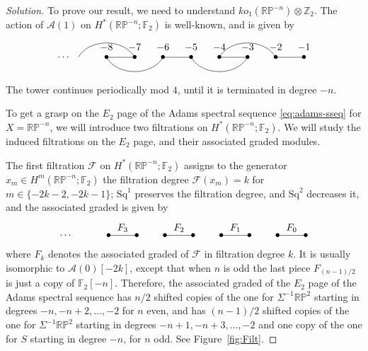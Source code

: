 \documentclass{amsart}
\def\RP{\mathbb{RP}}
\def\Filt{\mathcal{F}}
\newcommand{\Steenrod}{\mathcal{A}}
\newcommand{\Aone}{\Steenrod(1)}
\newcommand{\Azero}{\Steenrod(0)}
\newcommand{\FF}{\mathbb{F}}
\newcommand{\ZZ}{\mathbb{Z}}
\newcommand{\Sq}{\mathrm{Sq}}
\begin{document}
\begin{proof}[Solution]
To prove our result, we need to understand
$ko_1(\RP^{-n}) \otimes \ZZ_2$. The action of $\Aone$ on
$H^*(\RP^{-n} ; \FF_2)$ is well-known, and is given by
\begin{equation}
\vcenter{\hbox{\begin{tikzpicture}[xscale=-1]
    \foreach\i in {1,...,8}{
      \node at (\i,0) {$\bullet$};
      \node[anchor=south] at (\i,0.1) {$-\i$};
    }
    \foreach \i in {1,3,...,7}{
      \draw (\i,0) -- (\i+1,0);
    }
    \foreach \i/\r in {2/1,3/-1,6/-1,7/1}{
      \draw (\i,0) to[out=\r*60,in=\r*120] (\i+2,0);
    }
    \node at (9.5,0) {$\cdots$};
  \end{tikzpicture}}}
\end{equation}
The tower continues periodically mod $4$, until it is terminated in degree $-n$.


To get a grasp on the $E_2$ page of the Adams spectral sequence \eqref{eq:adams-sseq} for $X=\RP^{-n}$, we will introduce two filtrations on $H^*(\RP^{-n}; \FF_2)$. We will study the induced filtrations on the $E_2$ page, and their associated graded modules.



The first filtration $\Filt$ on $H^*(\RP^{-n}; \FF_2)$ assigns to the generator $x_m \in H^m(\RP^{-n}; \FF_2)$ the filtration degree $\Filt(x_m) = k$ for  $m \in\{  -2k-2, -2k-1\}$; $\Sq^1$ preserves the filtration degree, and $\Sq^2$ decreases it, and the associated graded is given by
\begin{equation}
\vcenter{\hbox{\begin{tikzpicture}[xscale=-1]
    \foreach\i in {1,...,8}{
      \node at (\i,0) {$\bullet$};
    }
    \foreach \i in {0,1,2,3}{
      \draw (2*\i+1,0) -- (2*\i+2,0);
      \node[anchor=south] at (2*\i+1.5,0) {$F_\i$};
    }
    \node at (9.5,0) {$\cdots$};
  \end{tikzpicture}}}
\end{equation}
where $F_k$ denotes the associated graded of $\Filt$ in filtration
degree $k$. It is usually isomorphic to $\Azero[-2k]$, except that when $n$
is odd the last piece $F_{(n-1)/2}$ is just a copy of $\FF_2[-n]$. Therefore, the associated graded
of the $E_2$ page of the Adams spectral sequence has $n/2$ shifted
copies of the one for $\Sigma^{-1}\RP^2$ starting in degrees
$-n, -n+2, \dots, -2$ for $n$ even, and has $(n-1)/2$ shifted copies
of the one for $\Sigma^{-1}\RP^2$ starting in degrees
$-n+1, -n+3, \dots, -2$ and one copy of the one for $S$ starting in
degree $-n$, for $n$ odd.  See Figure~\ref{fig:Filt}.



\end{proof}
\end{document}
